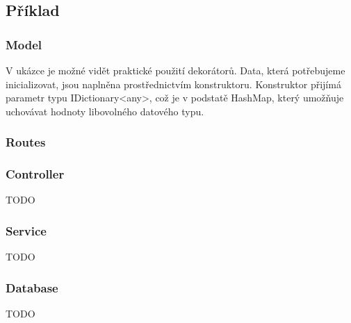\subsection{Příklad}

\subsubsection{Model}


V ukázce je možné vidět praktické použití dekorátorů. Data, která potřebujeme inicializovat, jsou naplněna prostřednictvím konstruktoru. Konstruktor přijímá parametr typu IDictionary<any>, což je v podstatě HashMap, který umožňuje uchovávat hodnoty libovolného datového typu.


\subsubsection{Routes}

\subsubsection{Controller}


TODO

\subsubsection{Service}


TODO

\subsubsection{Database}


TODO